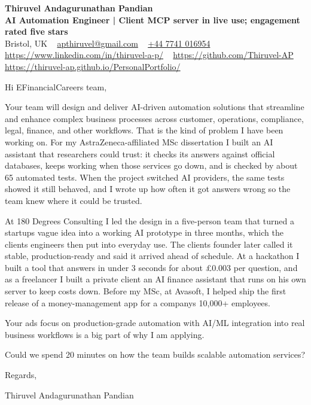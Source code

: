 \documentclass[11pt,a4paper]{article}
\begin{document}
\raggedright
\pagestyle{empty}

\begin{center}
    {\LARGE \color{linkblue} \textbf{Thiruvel Andagurunathan Pandian}}\\[0.2cm]
    {\color{headernavy}\small\textbf{AI Automation Engineer | Client MCP server in live use; engagement rated five stars}}\\[0.2cm]
    {\small Bristol, UK\nobreak\ \,\textbar\, \href{mailto:apthiruvel@gmail.com}{apthiruvel@gmail.com}\nobreak\ \,\textbar\, \href{tel:+447741016954}{+44 7741 016954}\nobreak\ \,\textbar\, \href{https://www.linkedin.com/in/thiruvel-a-p/}{https://www.linkedin.com/in/thiruvel-a-p/}\nobreak\ \,\textbar\, \href{https://github.com/Thiruvel-AP}{https://github.com/Thiruvel-AP}\nobreak\ \,\textbar\, \href{https://thiruvel-ap.github.io/PersonalPortfolio/}{https://thiruvel-ap.github.io/PersonalPortfolio/}}

\end{center}

\vspace{0.4cm}

\noindent
Hi EFinancialCareers team,

Your team will design and deliver AI-driven automation solutions that streamline and enhance complex business processes across customer, operations, compliance, legal, finance, and other workflows. That is the kind of problem I have been working on. For my AstraZeneca-affiliated MSc dissertation I built an AI assistant that researchers could trust: it checks its answers against official databases, keeps working when those services go down, and is checked by about 65 automated tests. When the project switched AI providers, the same tests showed it still behaved, and I wrote up how often it got answers wrong so the team knew where it could be trusted.

At 180 Degrees Consulting I led the design in a five-person team that turned a startup\textquotesingle{}s vague idea into a working AI prototype in three months, which the client\textquotesingle{}s engineers then put into everyday use. The client\textquotesingle{}s founder later called it \textquotedbl{}stable, production-ready\textquotedbl{} and said it arrived \textquotedbl{}ahead of schedule\textquotedbl{}. At a hackathon I built a tool that answers in under 3 seconds for about £0.003 per question, and as a freelancer I built a private client an AI finance assistant that runs on his own server to keep costs down. Before my MSc, at Avasoft, I helped ship the first release of a money-management app for a company\textquotesingle{}s 10,000+ employees.

Your ad\textquotesingle{}s focus on production-grade automation with AI/ML integration into real business workflows is a big part of why I am applying.

Could we spend 20 minutes on how the team builds scalable automation services?

\vspace{0.5cm}

Regards,

Thiruvel Andagurunathan Pandian
\end{document}

